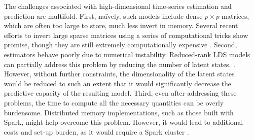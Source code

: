 \documentclass[fleqn,12pt]{article}
\begin{document}
The challenges associated with high-dimensional time-series estimation and prediction are multifold.  First, na\"ively, such models include dense $p \times p$ matrices, which are often too large to store, much less invert in memory.  Several recent efforts to invert large sparse matrices using a series of computational tricks show promise, though they are still extremely computationally expensive  \citep{Hsieh2013, Banerjee2013a}.
%
%
%
Second, estimators behave poorly due to numerical instability.
Reduced-rank LDS models can partially address this problem by reducing the number of latent states.  \citep{CHEN1989}.  However, without further constraints, the dimensionality of the latent states would be reduced to such an extent  that it would significantly decrease the predictive capacity of the resulting model.  Third, even after addressing these problems, the time to compute all the necessary quantities can be overly burdensome. Distributed memory implementations, such as those built with Spark, might help overcome this problem. However, it would lead to additional costs and set-up burden, as it would require a Spark cluster \citep{Zaharia2010}.
%
%
%
%
%
%
\end{document}

